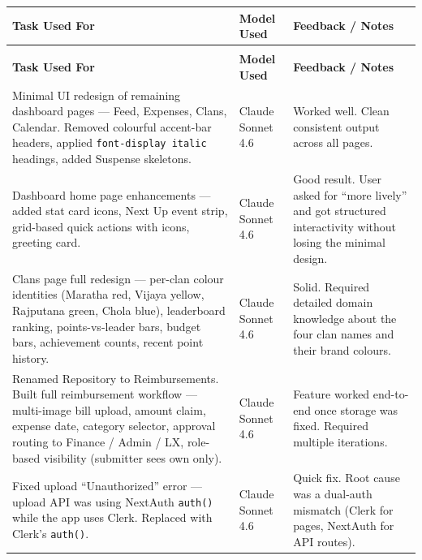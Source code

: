 \documentclass[11pt, a4paper]{article}
\begin{document}
\renewcommand{\arraystretch}{1.5}
\begin{longtable}{>{\raggedright\arraybackslash}p{7.5cm} >{\centering\arraybackslash}p{3cm} >{\raggedright\arraybackslash}p{4.5cm}}

\toprule
\textbf{Task Used For} & \textbf{Model Used} & \textbf{Feedback / Notes} \\
\midrule
\endfirsthead

\multicolumn{3}{c}{\small\textit{(continued from previous page)}} \\
\toprule
\textbf{Task Used For} & \textbf{Model Used} & \textbf{Feedback / Notes} \\
\midrule
\endhead

\bottomrule
\endlastfoot

Minimal UI redesign of remaining dashboard pages — Feed, Expenses, Clans, Calendar. Removed colourful accent-bar headers, applied \texttt{font-display italic} headings, added Suspense skeletons.
& Claude Sonnet 4.6
& Worked well. Clean consistent output across all pages. \\

Dashboard home page enhancements — added stat card icons, Next Up event strip, grid-based quick actions with icons, greeting card.
& Claude Sonnet 4.6
& Good result. User asked for ``more lively'' and got structured interactivity without losing the minimal design. \\

Clans page full redesign — per-clan colour identities (Maratha red, Vijaya yellow, Rajputana green, Chola blue), leaderboard ranking, points-vs-leader bars, budget bars, achievement counts, recent point history.
& Claude Sonnet 4.6
& Solid. Required detailed domain knowledge about the four clan names and their brand colours. \\

Renamed Repository to Reimbursements. Built full reimbursement workflow — multi-image bill upload, amount claim, expense date, category selector, approval routing to Finance / Admin / LX, role-based visibility (submitter sees own only).
& Claude Sonnet 4.6
& Feature worked end-to-end once storage was fixed. Required multiple iterations. \\

Fixed upload ``Unauthorized'' error — upload API was using NextAuth \texttt{auth()} while the app uses Clerk. Replaced with Clerk's \texttt{auth()}.
& Claude Sonnet 4.6
& Quick fix. Root cause was a dual-auth mismatch (Clerk for pages, NextAuth for API routes). \\


\end{longtable}
\end{document}
